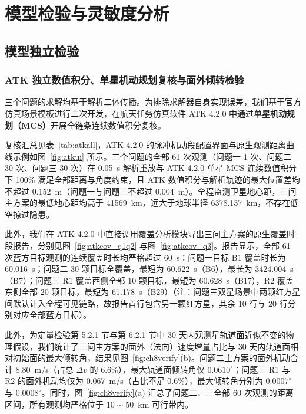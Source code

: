 \section{模型检验与灵敏度分析}

\subsection{模型独立检验}

\subsubsection{ATK 独立数值积分、单星机动规划复核与面外倾转检验}

三个问题的求解均基于解析二体传播。为排除求解器自身实现误差，我们基于官方仿真场景模板进行二次开发，在航天任务仿真软件 ATK 4.2.0 中通过\textbf{单星机动规划（MCS）}开展全链条连续数值积分复核。

复核汇总见表~\ref{tab:atkall}，ATK 4.2.0 的脉冲机动段配置界面与原生观测距离曲线示例如图~\ref{fig:atkui} 所示。三个问题的全部 61 次观测（问题一 1 次、问题二 30 次、问题三 30 次）在 0.05~s 解析重放与 ATK 4.2.0 单星 MCS 连续数值积分下 100\% 满足全部距离与角度约束，且 ATK 数值积分与解析轨迹的最大位置差均不超过 0.152~m（问题一与问题三不超过 0.004~m）。全程监测卫星地心距，三问主方案的最低地心距均高于 41569~km，远大于地球半径 6378.137~km，不存在低空掠过隐患。

此外，我们在 ATK 4.2.0 中直接调用覆盖分析模块导出三问主方案的原生覆盖时段报告，分别见图~\ref{fig:atkcov_q1q2} 与图~\ref{fig:atkcov_q3}。报告显示，全部 61 次蓝方目标观测的连续覆盖时长均严格超过 60~s：问题一目标 B1 覆盖时长为 60.016~s；问题二 30 颗目标全覆盖，最短为 60.622~s（B6），最长为 3424.004~s（B7）；问题三 R1 覆盖西侧全部 10 颗目标，最短为 60.628~s（B17），R2 覆盖东侧全部 20 颗目标，最短为 61.178~s（B29）（注：问题三双星场景中两颗红方星间默认计入全程可见链路，故报告首行包含另一颗红方星，其余 10 行与 20 行分别对应全部蓝方目标）。

此外，为定量检验第 5.2.1 节与第 6.2.1 节中 30 天内观测星轨道面近似不变的物理假设，我们统计了三问主方案的面外（法向）速度增量占比与 30 天内轨道面相对初始面的最大倾转角，结果见图~\ref{fig:ch8verify}(b)。问题二主方案的面外机动合计 8.80~m/s（占总 $\Delta v$ 的 6.6\%），最大轨道面倾转角仅 $0.0610^\circ$；问题三 R1 与 R2 的面外机动均仅为 0.067~m/s（占比不足 0.6\%），最大倾转角分别为 $0.0007^\circ$ 与 $0.0008^\circ$。同时，图~\ref{fig:ch8verify}(a) 汇总了问题二、三全部 60 次观测的距离区间，所有观测均严格位于 $10\sim 50$~km 可行带内。

